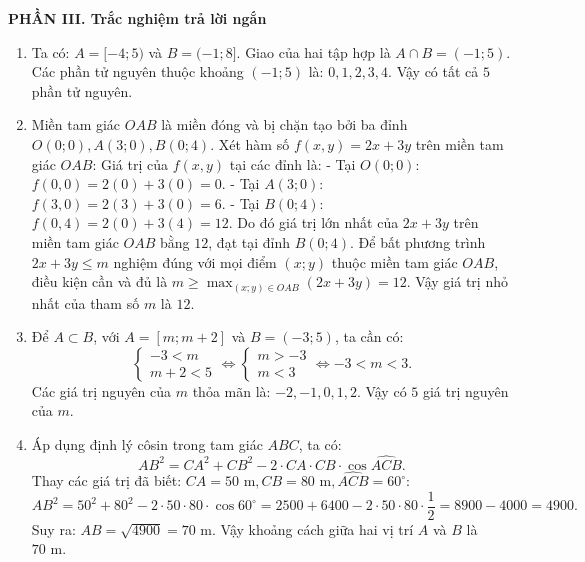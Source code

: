 \documentclass[12pt,a4paper]{article}
\begin{document}
\textbf{PHẦN III. Trắc nghiệm trả lời ngắn}
\begin{enumerate}[resume]
\item Ta có: $A = [-4; 5)$ và $B = (-1; 8]$.
Giao của hai tập hợp là $A \cap B = (-1; 5)$.
Các phần tử nguyên thuộc khoảng $(-1; 5)$ là: $0, 1, 2, 3, 4$.
Vậy có tất cả $5$ phần tử nguyên.

\item Miền tam giác $OAB$ là miền đóng và bị chặn tạo bởi ba đỉnh $O(0; 0), A(3; 0), B(0; 4)$.
Xét hàm số $f(x, y) = 2x + 3y$ trên miền tam giác $OAB$:
Giá trị của $f(x, y)$ tại các đỉnh là:
- Tại $O(0; 0)$: $f(0, 0) = 2(0) + 3(0) = 0$.
- Tại $A(3; 0)$: $f(3, 0) = 2(3) + 3(0) = 6$.
- Tại $B(0; 4)$: $f(0, 4) = 2(0) + 3(4) = 12$.
Do đó giá trị lớn nhất của $2x + 3y$ trên miền tam giác $OAB$ bằng $12$, đạt tại đỉnh $B(0; 4)$.
Để bất phương trình $2x + 3y \le m$ nghiệm đúng với mọi điểm $(x; y)$ thuộc miền tam giác $OAB$, điều kiện cần và đủ là $m \ge \max_{(x; y) \in OAB} (2x + 3y) = 12$.
Vậy giá trị nhỏ nhất của tham số $m$ là $12$.

\item Để $A \subset B$, với $A = [m; m + 2]$ và $B = (-3; 5)$, ta cần có:
\[
\begin{cases}
-3 < m \\
m + 2 < 5
\end{cases}
\iff
\begin{cases}
m > -3 \\
m < 3
\end{cases}
\iff -3 < m < 3.
\]
Các giá trị nguyên của $m$ thỏa mãn là: $-2, -1, 0, 1, 2$.
Vậy có $5$ giá trị nguyên của $m$.

\item Áp dụng định lý côsin trong tam giác $ABC$, ta có:
\[
AB^2 = CA^2 + CB^2 - 2 \cdot CA \cdot CB \cdot \cos \widehat{ACB}.
\]
Thay các giá trị đã biết: $CA = 50\text{ m}, CB = 80\text{ m}, \widehat{ACB} = 60^\circ$:
\[
AB^2 = 50^2 + 80^2 - 2 \cdot 50 \cdot 80 \cdot \cos 60^\circ = 2500 + 6400 - 2 \cdot 50 \cdot 80 \cdot \dfrac{1}{2} = 8900 - 4000 = 4900.
\]
Suy ra: $AB = \sqrt{4900} = 70\text{ m}$.
Vậy khoảng cách giữa hai vị trí $A$ và $B$ là $70\text{ m}$.
\end{enumerate}
\end{document}
